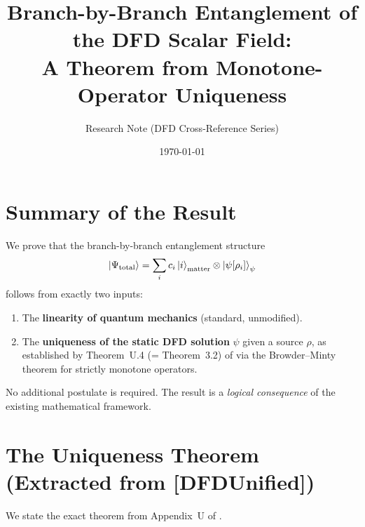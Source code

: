\documentclass[aps,prd,twocolumn,superscriptaddress,nofootinbib]{revtex4-2}
\begin{document}
\title{Branch-by-Branch Entanglement of the DFD Scalar Field:\\
A Theorem from Monotone-Operator Uniqueness}

\author{Research Note (DFD Cross-Reference Series)}
\date{\today}

\maketitle

\section{Summary of the Result}

We prove that the branch-by-branch entanglement structure
\begin{equation}\label{eq:main-result}
\ket{\Psi_{\mathrm{total}}} = \sum_i c_i \ket{i}_{\mathrm{matter}} \otimes
\ket{\psi[\rho_i]}_\psi
\end{equation}
follows from exactly two inputs:
\begin{enumerate}
\item The \textbf{linearity of quantum mechanics} (standard, unmodified).
\item The \textbf{uniqueness of the static DFD solution} $\psi$ given a
source $\rho$, as established by Theorem~U.4 (= Theorem~3.2) of
\cite{DFDUnified} via the Browder--Minty theorem for strictly monotone
operators.
\end{enumerate}

No additional postulate is required. The result is a \emph{logical
consequence} of the existing mathematical framework.

\section{The Uniqueness Theorem (Extracted from [DFDUnified])}

We state the exact theorem from Appendix~U of \cite{DFDUnified}.
\end{document}
